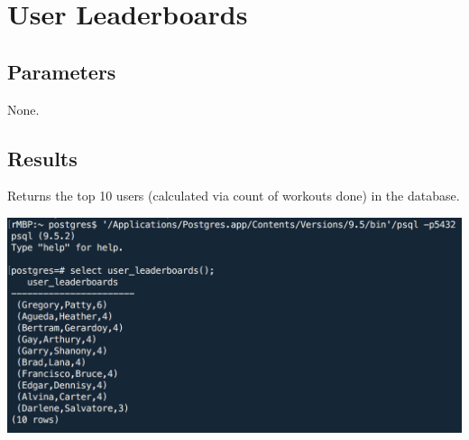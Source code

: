 \section{User Leaderboards}

\subsection{Parameters}
None.

\subsection{Results}
Returns the top 10 users (calculated via count of workouts done) in the database.

\begin{center}
\includegraphics[width=\columnwidth]{include/assets/screenshots/user_leaderboards}
\end{center}